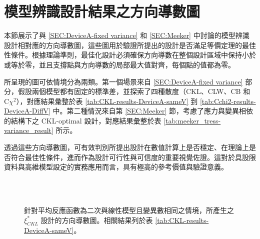 \chapter{模型辨識設計結果之方向導數圖}\label{appendixA}

\hspace*{8mm} 本節展示了與 \ref{SEC:DeviceA-fixed variance} 和 \ref{SEC:Meeker} 中討論的模型辨識設計相對應的方向導數圖，這些圖用於驗證所提出的設計是否滿足等價定理的最佳性條件。根據理論準則，最佳化設計必須確保方向導數在整個設計區域中保持小於或等於零，並且支撐點與方向導數的局部最大值對齊，每個點的值都為零。

\hspace*{8mm} 所呈現的圖可依情境分為兩類。第一個場景來自 \ref{SEC:DeviceA-fixed variance} 部分，假設兩個模型都有固定的標準差，並探索了四種散度（CKL、CLW、CB 和 C$\chi^2$），對應結果彙整於表 \ref{tab:CKL-results-DeviceA-sameV} 到 \ref{tab:Cchi2-results-DeviceA-DiffV} 中。第二種情況來自第 \ref{SEC:Meeker} 節，考慮了應力與變異相依的結構下之 CKL-optimal 設計，對應結果彙整於表 \ref{tab:meeker_tress-variance_result} 所示。

\hspace*{8mm} 透過這些方向導數圖，可有效判別所提出設計在數值計算上是否穩定、在理論上是否符合最佳性條件，進而作為設計可行性與可信度的重要視覺佐證。這對於具設限資料與高維模型設定的實務應用而言，具有極高的參考價值與驗證意義。


\begin{figure}[H]
\centering
{}
\\
\\
\caption{針對平均反應函數為二次與線性模型且變異數相同之情境，所產生之 $\xi^*_{CKL}$ 設計的方向導數圖。相關結果列於表 \ref{tab:CKL-results-DeviceA-sameV}。}
\label{fig:CKL-fixed-both-same-variance}
\end{figure}

